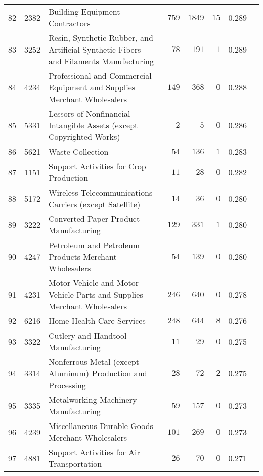 \documentclass[9pt, oneside]{article}   	%
\begin{document}
\begin{longtable}{lcp{3 in}ccccc}
82  & 2382 & Building Equipment Contractors & $\phantom{0}759$ & $1849$ & $15$ & 0.289 \\
83  & 3252 & Resin, Synthetic Rubber, and Artificial Synthetic Fibers and Filaments Manufacturing & $\phantom{00}78$ & $\phantom{0}191$ & $\phantom{0}1$ & 0.289 \\
84  & 4234 & Professional and Commercial Equipment and Supplies Merchant Wholesalers & $\phantom{0}149$ & $\phantom{0}368$ & $\phantom{0}0$ & 0.288 \\
85  & 5331 & Lessors of Nonfinancial Intangible Assets (except Copyrighted Works) & $\phantom{000}2$ & $\phantom{000}5$ & $\phantom{0}0$ & 0.286 \\
86  & 5621 & Waste Collection & $\phantom{00}54$ & $\phantom{0}136$ & $\phantom{0}1$ & 0.283 \\
87  & 1151 & Support Activities for Crop Production & $\phantom{00}11$ & $\phantom{00}28$ & $\phantom{0}0$ & 0.282 \\
88  & 5172 & Wireless Telecommunications Carriers (except Satellite) & $\phantom{00}14$ & $\phantom{00}36$ & $\phantom{0}0$ & 0.280 \\
89  & 3222 & Converted Paper Product Manufacturing & $\phantom{0}129$ & $\phantom{0}331$ & $\phantom{0}1$ & 0.280 \\
90  & 4247 & Petroleum and Petroleum Products Merchant Wholesalers & $\phantom{00}54$ & $\phantom{0}139$ & $\phantom{0}0$ & 0.280 \\
91  & 4231 & Motor Vehicle and Motor Vehicle Parts and Supplies Merchant Wholesalers & $\phantom{0}246$ & $\phantom{0}640$ & $\phantom{0}0$ & 0.278 \\
92  & 6216 & Home Health Care Services & $\phantom{0}248$ & $\phantom{0}644$ & $\phantom{0}8$ & 0.276 \\
93  & 3322 & Cutlery and Handtool Manufacturing & $\phantom{00}11$ & $\phantom{00}29$ & $\phantom{0}0$ & 0.275 \\
94  & 3314 & Nonferrous Metal (except Aluminum) Production and Processing & $\phantom{00}28$ & $\phantom{00}72$ & $\phantom{0}2$ & 0.275 \\
95  & 3335 & Metalworking Machinery Manufacturing & $\phantom{00}59$ & $\phantom{0}157$ & $\phantom{0}0$ & 0.273 \\
96  & 4239 & Miscellaneous Durable Goods Merchant Wholesalers & $\phantom{0}101$ & $\phantom{0}269$ & $\phantom{0}0$ & 0.273 \\
97  & 4881 & Support Activities for Air Transportation & $\phantom{00}26$ & $\phantom{00}70$ & $\phantom{0}0$ & 0.271 \\

\end{longtable}
\end{document}
